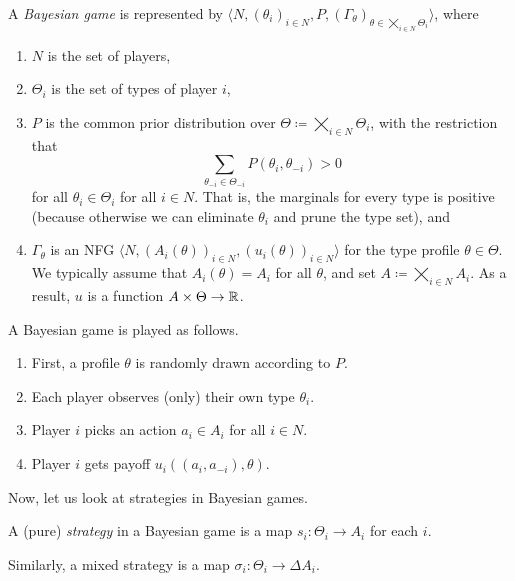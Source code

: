 	\begin{fdef}
		A \emph{Bayesian game} is represented by $\langle N , (\theta_i)_{i \in N} , P , (\Gamma_\theta)_{\theta \in \bigtimes_{i \in N} \Theta_i} \rangle$, where
		\begin{enumerate}
			\item $N$ is the set of players,
			\item $\Theta_i$ is the set of types of player $i$,
			\item $P$ is the common prior distribution over $\Theta \coloneqq \bigtimes_{i \in N} \Theta_i$, with the restriction that
			\[ \sum_{\theta_{-i} \in \Theta_{-i}} P(\theta_i,\theta_{-i}) > 0 \]
			for all $\theta_i \in \Theta_i$ for all $i \in N$. That is, the marginals for every type is positive (because otherwise we can eliminate $\theta_i$ and prune the type set), and
			\item $\Gamma_\theta$ is an NFG $\langle N , (A_i(\theta))_{i \in N} , (u_i(\theta))_{i \in N} \rangle$ for the type profile $\theta \in \Theta$. We typically assume that $A_i (\theta) = A_i$ for all $\theta$, and set $A \coloneqq \bigtimes_{i \in N} A_i$. As a result, $u$ is a function $A \times \Theta \to \mathbb{R}$.
		\end{enumerate}
	\end{fdef}

	A Bayesian game is played as follows.
	\begin{enumerate}
		\item First, a profile $\theta$ is randomly drawn according to $P$.
		\item Each player observes (only) their own type $\theta_i$.
		\item Player $i$ picks an action $a_i \in A_i$ for all $i \in N$.
		\item Player $i$ gets payoff $u_i((a_i,a_{-i}),\theta)$.
	\end{enumerate}

	Now, let us look at strategies in Bayesian games.

	\begin{fdef}
		A (pure) \emph{strategy} in a Bayesian game is a map $s_i : \Theta_i \to A_i$ for each $i$.
	\end{fdef}

	Similarly, a mixed strategy is a map $\sigma_i : \Theta_i \to \Delta A_i$.

